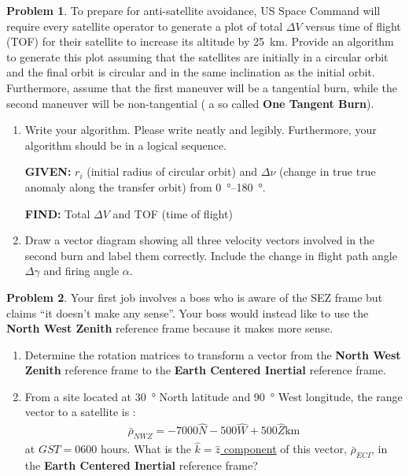 \documentclass[10pt]{article}
\theoremstyle{definition}
\newtheorem{prob}{Problem}[section]
\newenvironment{subprob}%
{\renewcommand{\theenumi}{\alph{enumi}}\renewcommand{\labelenumi}{(\theenumi)}\begin{enumerate}}%
{\end{enumerate}}%
\begin{document}
\begin{prob}
    To prepare for anti-satellite avoidance, US Space Command will require every satellite operator to generate a plot of total \( \Delta V \) versus time of flight (TOF) for their satellite to increase its altitude by \SI{25}{\kilo\meter}. 
    Provide an algorithm to generate this plot assuming that the satellites are initially in a circular orbit and the final orbit is circular and in the same inclination as the initial orbit. 
    Furthermore, assume that the first maneuver will be a tangential burn, while the second maneuver will be non-tangential ( a so called \textbf{One Tangent Burn}).

    \begin{subprob}
    \item Write your algorithm.
        Please write neatly and legibly.
        Furthermore, your algorithm should be in a logical sequence. 

        \textbf{GIVEN:} \( r_i\) (initial radius of circular orbit) and \( \Delta \nu\) (change in true true anomaly along the transfer orbit) from \SIrange{0}{180}{\degree}.

        \textbf{FIND:} Total \( \Delta V\) and TOF (time of flight)
        
        \clearpage\newpage
    \item Draw a vector diagram showing all three velocity vectors involved in the second burn and label them correctly.
        Include the change in flight path angle \( \Delta \gamma \) and firing angle \( \alpha \).
    \end{subprob} 
\end{prob}    


\begin{prob}
    Your first job involves a boss who is aware of the SEZ frame but claims ``it doesn't make any sense''.
    Your boss would instead like to use the \textbf{North West Zenith} reference frame because it makes more sense.

    \begin{subprob}
    \item Determine the rotation matrices to transform a vector from the \textbf{North West Zenith} reference frame to the \textbf{Earth Centered Inertial} reference frame.
    \item From a site located at \SI{30}{\degree} North latitude and \SI{90}{\degree} West longitude, the range vector to a satellite is :
        \begin{align*}
            \bar \rho_{NWZ} = - 7000 \hat N - 500 \hat W + 500 \hat Z \si{\kilo\meter}
        \end{align*}
        at \( GST = 0600\) hours.
        What is the \underline{ \( \hat k = \hat z \) component} of this vector, \( \bar \rho_{ECI}\), in the \textbf{Earth Centered Inertial} reference frame?
    \end{subprob}
\end{prob}
\end{document}
